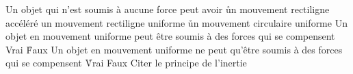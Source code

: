   \q
Un objet qui n'est soumis à aucune force peut avoir 
\r
un mouvement rectiligne accéléré
\rv
un mouvement rectiligne uniforme
\r
un mouvement circulaire uniforme
\q
Un objet en mouvement uniforme peut être soumis à des forces qui se compensent 
\rv
Vrai
\r
Faux
\q
Un objet en mouvement uniforme ne peut qu'être soumis à des forces qui se compensent 
\r
Vrai
\rv
Faux
\q
Citer le principe de l'inertie 


